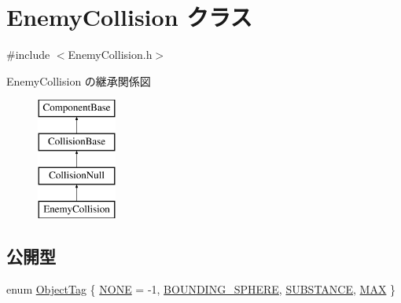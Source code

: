\hypertarget{class_enemy_collision}{}\section{Enemy\+Collision クラス}
\label{class_enemy_collision}


{\ttfamily \#include $<$Enemy\+Collision.\+h$>$}

Enemy\+Collision の継承関係図\begin{figure}[H]
\begin{center}
\leavevmode
\includegraphics[height=4.000000cm]{class_enemy_collision}
\end{center}
\end{figure}
\subsection*{公開型}
\begin{DoxyCompactItemize}
\item 
enum \mbox{\hyperlink{class_enemy_collision_a8423c2c1dce9ba8ab2ba9bed82ee4843}{Object\+Tag}} \{ \mbox{\hyperlink{class_enemy_collision_a8423c2c1dce9ba8ab2ba9bed82ee4843a54855bb90bae23d3697d74e0b20462a2}{N\+O\+NE}} = -\/1, 
\mbox{\hyperlink{class_enemy_collision_a8423c2c1dce9ba8ab2ba9bed82ee4843a327f14f5b5cd28a3e605ff4f7066e8ce}{B\+O\+U\+N\+D\+I\+N\+G\+\_\+\+S\+P\+H\+E\+RE}}, 
\mbox{\hyperlink{class_enemy_collision_a8423c2c1dce9ba8ab2ba9bed82ee4843a8c9cd2ea0a1628d412fc501c91541ab0}{S\+U\+B\+S\+T\+A\+N\+CE}}, 
\mbox{\hyperlink{class_enemy_collision_a8423c2c1dce9ba8ab2ba9bed82ee4843a4283c301ae1d9317453c36d5923f7136}{M\+AX}}
 \}
\end{DoxyCompactItemize}
